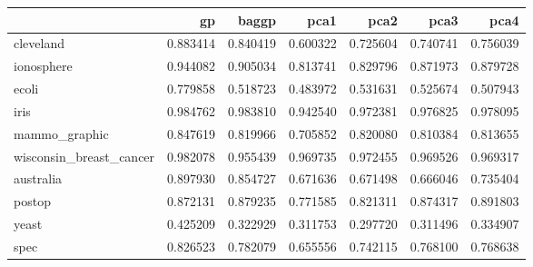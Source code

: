 \begin{tabular}{lrrrrrr}
\toprule
{} &        gp &     baggp &      pca1 &      pca2 &      pca3 &      pca4 \\
\midrule
cleveland               &  0.883414 &  0.840419 &  0.600322 &  0.725604 &  0.740741 &  0.756039 \\
ionosphere              &  0.944082 &  0.905034 &  0.813741 &  0.829796 &  0.871973 &  0.879728 \\
ecoli                   &  0.779858 &  0.518723 &  0.483972 &  0.531631 &  0.525674 &  0.507943 \\
iris                    &  0.984762 &  0.983810 &  0.942540 &  0.972381 &  0.976825 &  0.978095 \\
mammo\_graphic           &  0.847619 &  0.819966 &  0.705852 &  0.820080 &  0.810384 &  0.813655 \\
wisconsin\_breast\_cancer &  0.982078 &  0.955439 &  0.969735 &  0.972455 &  0.969526 &  0.969317 \\
australia               &  0.897930 &  0.854727 &  0.671636 &  0.671498 &  0.666046 &  0.735404 \\
postop                  &  0.872131 &  0.879235 &  0.771585 &  0.821311 &  0.874317 &  0.891803 \\
yeast                   &  0.425209 &  0.322929 &  0.311753 &  0.297720 &  0.311496 &  0.334907 \\
spec                    &  0.826523 &  0.782079 &  0.655556 &  0.742115 &  0.768100 &  0.768638 \\
\bottomrule
\end{tabular}

